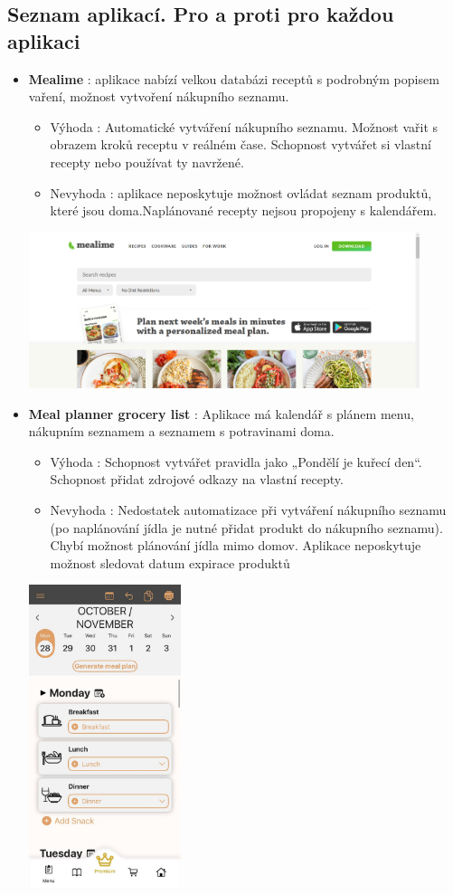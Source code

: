 \documentclass[a4paper,12pt]{article}
\begin{document}
\subsection*{Seznam aplikací. Pro a proti pro každou aplikaci}
\begin{itemize}
    \item \textbf{Mealime} : aplikace nabízí velkou databázi receptů s podrobným popisem vaření, možnost vytvoření nákupního seznamu.
    \begin{itemize}
        \item Výhoda :  Automatické vytváření nákupního seznamu. Možnost vařit s obrazem kroků receptu v reálném čase. Schopnost vytvářet si vlastní recepty nebo používat ty navržené.
        \item Nevyhoda : aplikace neposkytuje možnost ovládat seznam produktů, které jsou doma.Naplánované recepty nejsou propojeny s kalendářem.
    \end{itemize}
    \includegraphics[width=0.9\textwidth]{mealime.png}
    

    \item \textbf{Meal planner grocery list} : Aplikace má kalendář s plánem menu, nákupním seznamem a seznamem s potravinami doma.
    \begin{itemize}
        \item Výhoda : Schopnost vytvářet pravidla jako „Pondělí je kuřecí den“. Schopnost přidat zdrojové odkazy na vlastní recepty.
        \item Nevyhoda : Nedostatek automatizace při vytváření nákupního seznamu (po naplánování jídla je nutné přidat produkt do nákupního seznamu). Chybí možnost plánování jídla mimo domov.  Aplikace neposkytuje možnost sledovat datum expirace produktů
    \end{itemize}
    \includegraphics[width=0.35\textwidth]{grocerylist.png} %
    

\end{itemize}
\end{document}
